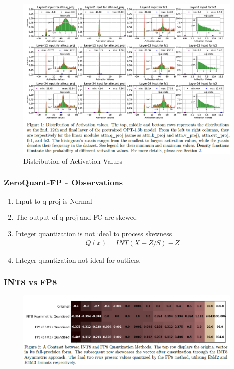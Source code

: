 \documentclass{beamer}
\theoremstyle{plain}
\theoremstyle{definition}
\theoremstyle{remark}
\numberwithin{equation}{section}
\numberwithin{figure}{section}
\numberwithin{theorem}{section}
\begin{document}
\begin{frame}
\begin{figure}
    \centering
    \includegraphics[width=0.9\linewidth]{distribution.png}
    \caption{Distribution of Activation Values}
    \label{fig:distribution-of-activation}
\end{figure}
\end{frame}


\begin{frame}
\frametitle{ZeroQuant-FP - Observations}
\begin{enumerate}
    \item Input to q-proj is Normal
    \item The output of q-proj and FC are skewed
    \item Integer quantization is not ideal to process skewness
    \begin{align}
        Q(x) = INT(X- Z/S) - Z
    \end{align}
    \item Integer quantization not ideal for outliers.
\end{enumerate}
\end{frame}

\begin{frame}
\frametitle{INT8 vs FP8}
\begin{figure}
    \centering
    \includegraphics[width=1\linewidth]{int8_vs_fp8.png}
    \label{fig:in8_vs_fp8}
\end{figure}
\end{frame}
\end{document}
